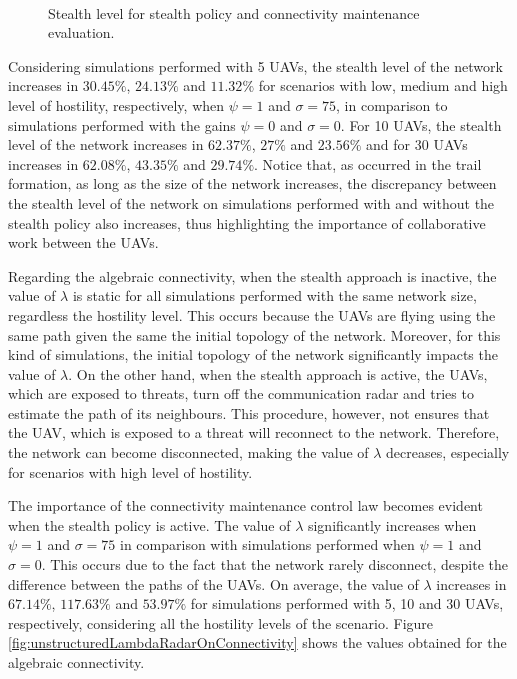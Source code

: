 \begin{figure}[hbt!]
      \centering            
         \\ \centering
      \caption{Stealth level for stealth policy and connectivity maintenance evaluation.}
      \label{fig:unstructuredStealthConnectivity}
\end{figure}

Considering simulations performed with 5 UAVs, the stealth level of the network increases in  $30.45\%$, $24.13\%$ and $11.32\%$ for scenarios with low, medium and high level of hostility, respectively, when $\psi=1$ and $\sigma=75$, in comparison to simulations performed with the gains $\psi=0$ and $\sigma=0$. For 10 UAVs, the stealth level of the network increases in $62.37\%$, $27\%$ and $23.56\%$ and for 30 UAVs increases in $62.08\%$, $43.35\%$ and $29.74\%$. Notice that, as occurred in the trail formation, as long as the size of the network increases, the discrepancy between the stealth level of the network on simulations performed with and without the stealth policy also increases, thus highlighting the importance of collaborative work between the UAVs.

Regarding the algebraic connectivity, when the stealth approach is inactive, the value of $\lambda$ is static for all simulations performed with the same network size, regardless the hostility level. This occurs because the UAVs are flying using the same path given the same the initial topology of the network. Moreover, for this kind of simulations, the initial topology of the network significantly impacts the value of $\lambda$. On the other hand, when the stealth approach is active, the UAVs, which are exposed to threats, turn off the communication radar and tries to estimate the path of its neighbours. This procedure, however, not ensures that the UAV, which is exposed to a threat will reconnect to the network. Therefore, the network can become disconnected, making the value of $\lambda$ decreases, especially for scenarios with high level of hostility.

The importance of the connectivity maintenance control law becomes evident when the stealth policy is active. The value of $\lambda$ significantly increases when $\psi=1$ and $\sigma=75$ in comparison with simulations performed when $\psi=1$ and $\sigma=0$. This occurs due to the fact that the network rarely disconnect, despite the difference between the paths of the UAVs. On average, the value of $\lambda$ increases in $67.14\%$, $117.63\%$ and $53.97\%$ for simulations performed with 5, 10 and 30 UAVs, respectively, considering all the hostility levels of the scenario. Figure \ref{fig:unstructuredLambdaRadarOnConnectivity} shows the values obtained for the algebraic connectivity. 

